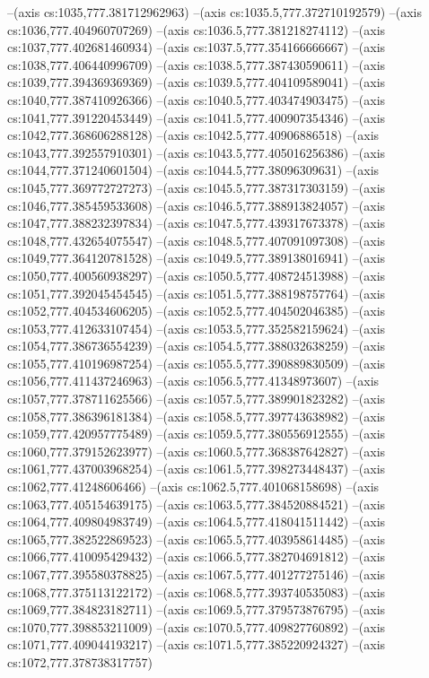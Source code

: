 --(axis cs:1035,777.381712962963)
--(axis cs:1035.5,777.372710192579)
--(axis cs:1036,777.404960707269)
--(axis cs:1036.5,777.381218274112)
--(axis cs:1037,777.402681460934)
--(axis cs:1037.5,777.354166666667)
--(axis cs:1038,777.406440996709)
--(axis cs:1038.5,777.387430590611)
--(axis cs:1039,777.394369369369)
--(axis cs:1039.5,777.404109589041)
--(axis cs:1040,777.387410926366)
--(axis cs:1040.5,777.403474903475)
--(axis cs:1041,777.391220453449)
--(axis cs:1041.5,777.400907354346)
--(axis cs:1042,777.368606288128)
--(axis cs:1042.5,777.40906886518)
--(axis cs:1043,777.392557910301)
--(axis cs:1043.5,777.405016256386)
--(axis cs:1044,777.371240601504)
--(axis cs:1044.5,777.38096309631)
--(axis cs:1045,777.369772727273)
--(axis cs:1045.5,777.387317303159)
--(axis cs:1046,777.385459533608)
--(axis cs:1046.5,777.388913824057)
--(axis cs:1047,777.388232397834)
--(axis cs:1047.5,777.439317673378)
--(axis cs:1048,777.432654075547)
--(axis cs:1048.5,777.407091097308)
--(axis cs:1049,777.364120781528)
--(axis cs:1049.5,777.389138016941)
--(axis cs:1050,777.400560938297)
--(axis cs:1050.5,777.408724513988)
--(axis cs:1051,777.392045454545)
--(axis cs:1051.5,777.388198757764)
--(axis cs:1052,777.404534606205)
--(axis cs:1052.5,777.404502046385)
--(axis cs:1053,777.412633107454)
--(axis cs:1053.5,777.352582159624)
--(axis cs:1054,777.386736554239)
--(axis cs:1054.5,777.388032638259)
--(axis cs:1055,777.410196987254)
--(axis cs:1055.5,777.390889830509)
--(axis cs:1056,777.411437246963)
--(axis cs:1056.5,777.41348973607)
--(axis cs:1057,777.378711625566)
--(axis cs:1057.5,777.389901823282)
--(axis cs:1058,777.386396181384)
--(axis cs:1058.5,777.397743638982)
--(axis cs:1059,777.420957775489)
--(axis cs:1059.5,777.380556912555)
--(axis cs:1060,777.379152623977)
--(axis cs:1060.5,777.368387642827)
--(axis cs:1061,777.437003968254)
--(axis cs:1061.5,777.398273448437)
--(axis cs:1062,777.41248606466)
--(axis cs:1062.5,777.401068158698)
--(axis cs:1063,777.405154639175)
--(axis cs:1063.5,777.384520884521)
--(axis cs:1064,777.409804983749)
--(axis cs:1064.5,777.418041511442)
--(axis cs:1065,777.382522869523)
--(axis cs:1065.5,777.403958614485)
--(axis cs:1066,777.410095429432)
--(axis cs:1066.5,777.382704691812)
--(axis cs:1067,777.395580378825)
--(axis cs:1067.5,777.401277275146)
--(axis cs:1068,777.375113122172)
--(axis cs:1068.5,777.393740535083)
--(axis cs:1069,777.384823182711)
--(axis cs:1069.5,777.379573876795)
--(axis cs:1070,777.398853211009)
--(axis cs:1070.5,777.409827760892)
--(axis cs:1071,777.409044193217)
--(axis cs:1071.5,777.385220924327)
--(axis cs:1072,777.378738317757)
